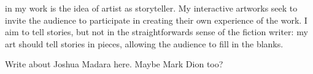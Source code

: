 \documentclass[a4paper,nobib]{tufte-handout}
\begin{document}
 in my work is the idea of artist as storyteller. My interactive artworks seek to invite the audience to participate in creating their own experience of the work. I aim to tell stories, but not in the straightforwards sense of the fiction writer: my art should tell stories in pieces, allowing the audience to fill in the blanks.

Write about Joshua Madara here\autocite{madara,madarabeing,madaramagic}. Maybe Mark Dion too?

\printbibliography
\end{document}
